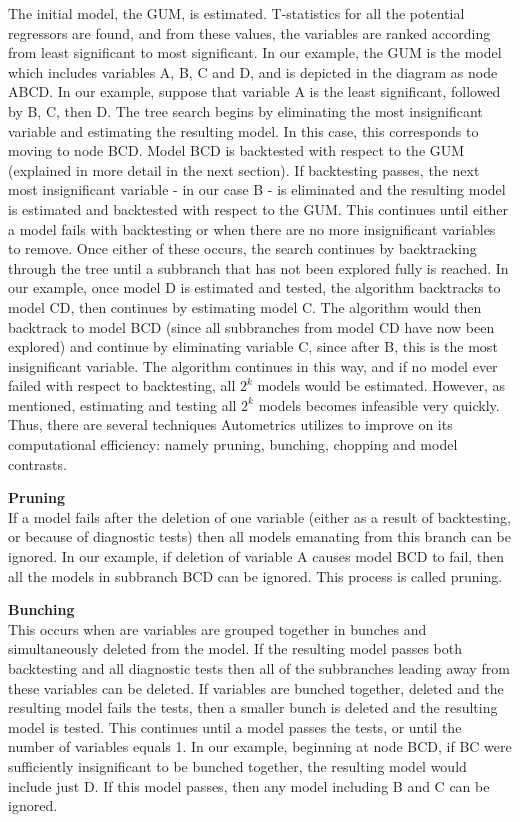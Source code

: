 \documentclass[11pt, oneside]{book}   	%
\begin{document}
\begin{enumerate}
The initial model, the GUM, is estimated. T-statistics for all the potential regressors are found, and from these values, the variables are ranked according from least significant to most significant. In our example, the GUM  is the model which includes variables A, B, C and D, and is depicted in the diagram as node ABCD. In our example, suppose that variable A is the least significant, followed by B, C, then D. The tree search begins by eliminating the most insignificant variable and estimating the resulting model. In this case, this corresponds to moving to node BCD. Model BCD is backtested with respect to the GUM (explained in more detail in the next section). If backtesting passes, the next most insignificant variable - in our case B - is eliminated and the resulting model is estimated and backtested with respect to the GUM. This continues until either a model fails with backtesting or when there are no more insignificant variables to remove. Once either of these occurs, the search continues by backtracking through the tree until a subbranch that has not been explored fully is reached. In our example, once model D is estimated and tested, the algorithm backtracks to model CD, then continues by estimating model C. The algorithm would then backtrack to model BCD (since all subbranches from model CD have now been explored) and continue by eliminating variable C, since after B, this is the most insignificant variable. The algorithm continues in this way, and if no model ever failed with respect to backtesting, all $2^{k}$ models would be estimated. However, as mentioned, estimating and testing all $2^{k}$ models becomes infeasible very quickly. Thus, there are several techniques Autometrics utilizes to improve on its computational efficiency: namely pruning, bunching, chopping and model contrasts. 


\textbf{Pruning} \\
If a model fails after the deletion of one variable (either as a result of backtesting, or because of diagnostic tests) then all models emanating from this branch can be ignored. In our example, if deletion of variable A causes model BCD to fail, then all the models in subbranch BCD can be ignored. This process is called pruning. 

\textbf{Bunching}\\
This occurs when are variables are grouped together in bunches and simultaneously deleted from the model. If the resulting model passes both backtesting and all diagnostic tests then all of the subbranches leading away from these variables can be deleted. If variables are bunched together, deleted and the resulting model fails the tests, then a smaller bunch is deleted and the resulting model is tested. This continues until a model passes the tests, or until the number of variables equals 1. In our example, beginning at node BCD, if BC were sufficiently insignificant to be bunched together, the resulting model would include just D. If this model passes, then any model including B and C can be ignored.


\end{enumerate}
\end{document}
